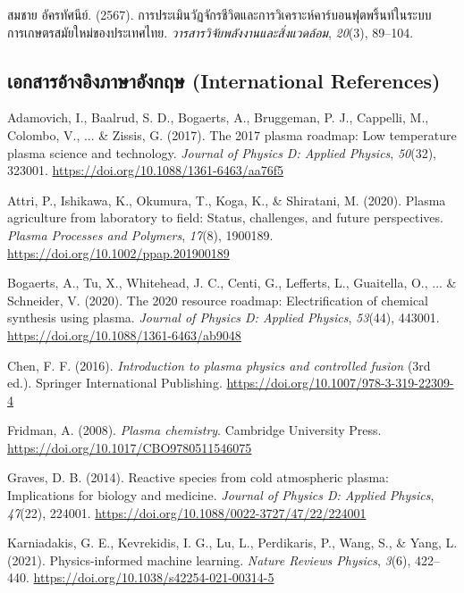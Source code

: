 สมชาย อัครทัศนีย์. (2567). การประเมินวัฏจักรชีวิตและการวิเคราะห์คาร์บอนฟุตพริ้นท์ในระบบการเกษตรสมัยใหม่ของประเทศไทย. \textit{วารสารวิจัยพลังงานและสิ่งแวดล้อม}, \textit{20}(3), 89--104.

\vspace{12pt}
\subsection*{เอกสารอ้างอิงภาษาอังกฤษ (International References)}

Adamovich, I., Baalrud, S. D., Bogaerts, A., Bruggeman, P. J., Cappelli, M., Colombo, V., ... \& Zissis, G. (2017). The 2017 plasma roadmap: Low temperature plasma science and technology. \textit{Journal of Physics D: Applied Physics}, \textit{50}(32), 323001. \url{https://doi.org/10.1088/1361-6463/aa76f5}

Attri, P., Ishikawa, K., Okumura, T., Koga, K., \& Shiratani, M. (2020). Plasma agriculture from laboratory to field: Status, challenges, and future perspectives. \textit{Plasma Processes and Polymers}, \textit{17}(8), 1900189. \url{https://doi.org/10.1002/ppap.201900189}

Bogaerts, A., Tu, X., Whitehead, J. C., Centi, G., Lefferts, L., Guaitella, O., ... \& Schneider, V. (2020). The 2020 resource roadmap: Electrification of chemical synthesis using plasma. \textit{Journal of Physics D: Applied Physics}, \textit{53}(44), 443001. \url{https://doi.org/10.1088/1361-6463/ab9048}

Chen, F. F. (2016). \textit{Introduction to plasma physics and controlled fusion} (3rd ed.). Springer International Publishing. \url{https://doi.org/10.1007/978-3-319-22309-4}

Fridman, A. (2008). \textit{Plasma chemistry}. Cambridge University Press. \url{https://doi.org/10.1017/CBO9780511546075}

Graves, D. B. (2014). Reactive species from cold atmospheric plasma: Implications for biology and medicine. \textit{Journal of Physics D: Applied Physics}, \textit{47}(22), 224001. \url{https://doi.org/10.1088/0022-3727/47/22/224001}

Karniadakis, G. E., Kevrekidis, I. G., Lu, L., Perdikaris, P., Wang, S., \& Yang, L. (2021). Physics-informed machine learning. \textit{Nature Reviews Physics}, \textit{3}(6), 422--440. \url{https://doi.org/10.1038/s42254-021-00314-5}

